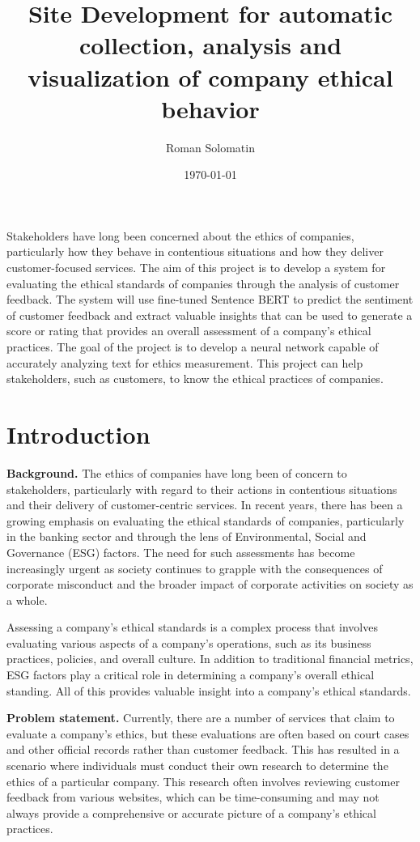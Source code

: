 \documentclass[PI]{ProjectProposal}
\author{Roman Solomatin}
\date{\today}
\title{Site Development for automatic collection, analysis and visualization of company ethical behavior}
\begin{document}
\maketitle
Stakeholders have long been concerned about the ethics of companies, particularly how they behave in contentious situations and how they deliver customer-focused services. The aim of this project is to develop a system for evaluating the ethical standards of companies through the analysis of customer feedback. The system will use fine-tuned Sentence BERT to predict the sentiment of customer feedback and extract valuable insights that can be used to generate a score or rating that provides an overall assessment of a company's ethical practices. The goal of the project is to develop a neural network capable of accurately analyzing text for ethics measurement. This project can help stakeholders, such as customers, to know the ethical practices of companies.

\chapter{Introduction}
\label{sec:orgf3bc7d5}
\textbf{Background.} The ethics of companies have long been of concern to stakeholders, particularly with regard to their actions in contentious situations and their delivery of customer-centric services. In recent years, there has been a growing emphasis on evaluating the ethical standards of companies, particularly in the banking sector and through the lens of Environmental, Social and Governance (ESG) factors\autocites{mure_esg_2021}[][]{miralles-quiros_esg_2019}[][]{climent_ethical_2018}. The need for such assessments has become increasingly urgent as society continues to grapple with the consequences of corporate misconduct and the broader impact of corporate activities on society as a whole.

Assessing a company's ethical standards is a complex process that involves evaluating various aspects of a company's operations, such as its business practices, policies, and overall culture. In addition to traditional financial metrics, ESG factors play a critical role in determining a company's overall ethical standing. All of this provides valuable insight into a company's ethical standards.

\textbf{Problem statement.} Currently, there are a number of services that claim to evaluate a company's ethics, but these evaluations are often based on court cases and other official records rather than customer feedback. This has resulted in a scenario where individuals must conduct their own research to determine the ethics of a particular company. This research often involves reviewing customer feedback from various websites, which can be time-consuming and may not always provide a comprehensive or accurate picture of a company's ethical practices.
\end{document}
